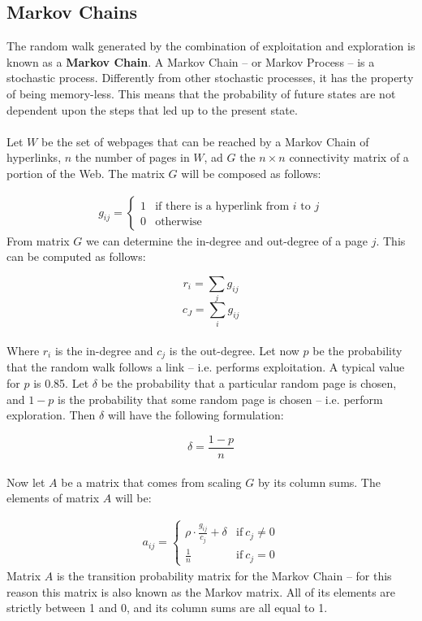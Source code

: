 \documentclass{article}
\begin{document}
\subsection{Markov Chains}
The random walk generated by the combination of exploitation and exploration is known as a \textbf{Markov Chain}. A Markov Chain -- or Markov Process -- is a stochastic process. Differently from other stochastic processes, it has the property of being memory-less. This means that the probability of future states are not dependent upon the steps that led up to the present state. \\ \\
Let $W$ be the set of webpages that can be reached by a Markov Chain of hyperlinks, $n$ the number of pages in $W$, ad $G$ the $n \times n$ connectivity matrix of a portion of the Web. The matrix $G$ will be composed as follows:

\begin{align*}
	g_{ij} = \begin{cases} 1 & \text{if there is a hyperlink from $i$ to $j$} \\ 0 & \text{otherwise} \end{cases}
\end{align*}
From matrix $G$ we can determine the in-degree and out-degree of a page $j$. This can be computed as follows:

\[ r_i = \sum_j g_{ij} \]
\[ c_J = \sum_i g_{ij} \] \\
Where $r_i$ is the in-degree and $c_j$ is the out-degree. Let now $p$ be the probability that the random walk follows a link -- i.e. performs exploitation. A typical value for $p$ is 0.85. Let $\delta$ be the probability that a particular random page is chosen, and $1-p$ is the probability that some random page is chosen -- i.e. perform exploration. Then $\delta$ will have the following formulation:

\[ \delta = \frac{1-p}{n} \] \\
Now let $A$ be a matrix that comes from scaling $G$ by its column sums. The elements of matrix $A$ will be:

\begin{align*}
	a_{ij} = \begin{cases} \rho \cdot \frac{g_{ij}}{c_j} + \delta & \text{if}~c_j \neq 0 \\ \frac{1}{n} & \text{if}~ c_j = 0 \end{cases}
\end{align*}
Matrix $A$ is the transition probability matrix for the Markov Chain -- for this reason this matrix is also known as the Markov matrix. All of its elements are strictly between 1 and 0, and its column sums are all equal to 1.
\end{document}
